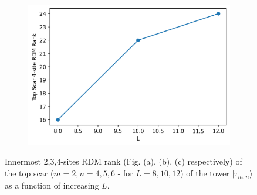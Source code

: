 \documentclass[11pt]{article}
\begin{document}
\begin{itemize}
\begin{itemize}
\begin{figure}[H]
\begin{subfigure}{0.45\textwidth}
        \includegraphics[width=\linewidth]{hb_scar_4t.png}
        \caption{}
        \label{fig:image3hb}
    \end{subfigure}

    \caption{Innermost 2,3,4-sites RDM rank (Fig. (a), (b), (c) respectively) of the top scar ($m=2, n=4,5,6$ - for $L=8,10,12$) of the tower $|\tau_{m,n}\rangle$ as a function of increasing $L$.}
    \label{fig:hb_scars_tower}
\end{figure}


\end{itemize}
\end{itemize}
\end{document}
